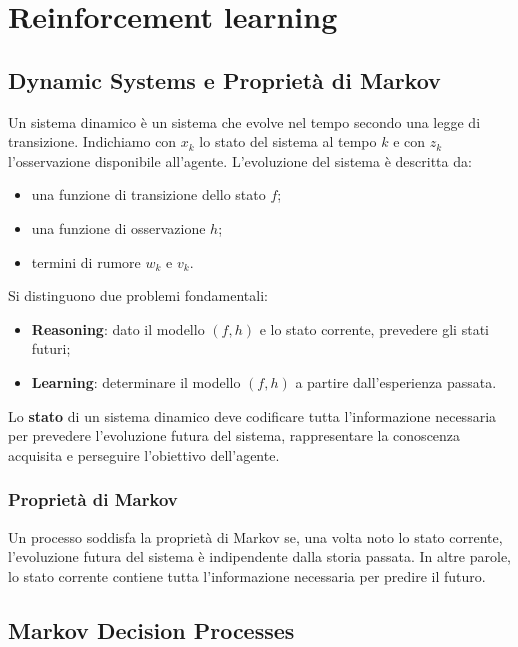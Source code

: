 \documentclass[a4paper,12pt]{report}
\begin{document}
\chapter{Reinforcement learning}

\section{Dynamic Systems e Proprietà di Markov}

Un sistema dinamico è un sistema che evolve nel tempo secondo una legge di transizione.
Indichiamo con $x_k$ lo stato del sistema al tempo $k$ e con $z_k$ l'osservazione
disponibile all'agente. L'evoluzione del sistema è descritta da:
\begin{itemize}
    \item una funzione di transizione dello stato $f$;
    \item una funzione di osservazione $h$;
    \item termini di rumore $w_k$ e $v_k$.
\end{itemize}

Si distinguono due problemi fondamentali:
\begin{itemize}
    \item \textbf{Reasoning}: dato il modello $(f,h)$ e lo stato corrente, prevedere
    gli stati futuri;
    \item \textbf{Learning}: determinare il modello $(f,h)$ a partire
    dall'esperienza passata.
\end{itemize}

Lo \textbf{stato} di un sistema dinamico deve codificare tutta l'informazione
necessaria per prevedere l'evoluzione futura del sistema, rappresentare la conoscenza acquisita e perseguire l'obiettivo dell'agente.

\subsection{Proprietà di Markov}

Un processo soddisfa la proprietà di Markov se, una volta noto lo stato corrente,
l'evoluzione futura del sistema è indipendente dalla storia passata.
In altre parole, lo stato corrente contiene tutta l'informazione necessaria
per predire il futuro.

\section{Markov Decision Processes}
\end{document}

